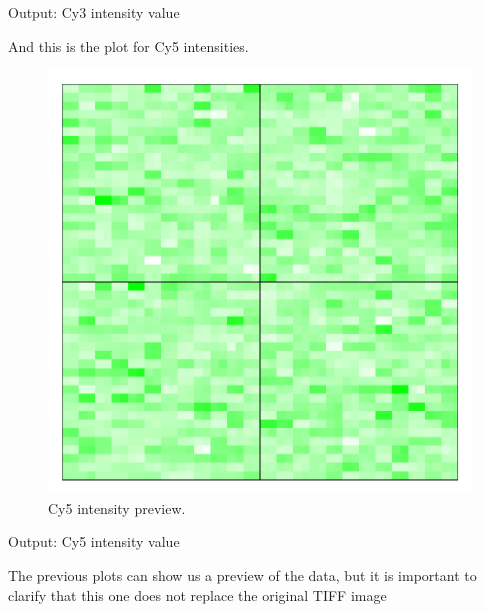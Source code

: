 \documentclass[12pt]{article}
\begin{document}
\begin{Soutput}
Output: Cy3 intensity value
\end{Soutput}
\pagebreak
And this is the plot for Cy5 intensities.
\begin{figure}[h]
\begin{center}
\includegraphics{example-genArise-005}
\caption{Cy5 intensity preview. \label{fig3}}	
\end{center}
\end{figure}

\begin{Soutput}
Output: Cy5 intensity value
\end{Soutput}
\pagebreak
The previous plots can show us a preview of the data, but it is important to clarify that this one does not replace the original TIFF image\\
\end{document}
